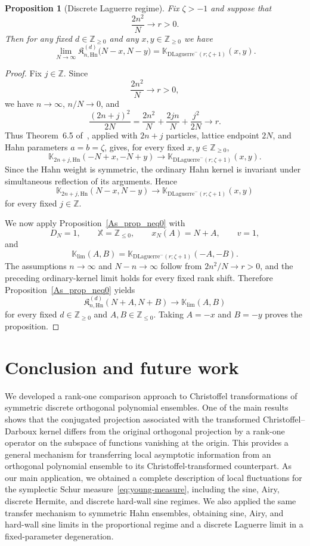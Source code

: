 \documentclass[reqno,11pt]{amsart}
\newcommand{\ZZ}{\mathbb{Z}}
\theoremstyle{plain}
\newtheorem{prop}[thm]{Proposition}
\theoremstyle{definition}
\numberwithin{equation}{section}
\begin{document}
\begin{prop}[Discrete Laguerre regime]\label{prop:hahn_discr-Laguerre}
Fix \(\zeta>-1\) and suppose that
\[
\frac{2n^2}{N}\longrightarrow r>0.
\]
Then for any fixed $d\in\ZZ_{\ge0}$ and
any $x,y\in\ZZ_{\ge0}$ we have
\[
\lim_{N\to\infty}
\mathfrak K^{(d)}_{n,\mathrm{Hn}}
\bigl(N-x,N-y\bigr)
=
\mathbb K_{\mathrm{DLaguerre}^{-}(r;\zeta+1)}(x,y).
\]
\end{prop}
\begin{proof}
Fix $j\in\ZZ$. Since
\[
\frac{2n^2}{N}\longrightarrow r>0,
\]
we have $n\to\infty$, $n/N\to0$, and
\[
\frac{(2n+j)^2}{2N} =
\frac{2n^2}{N} +
\frac{2jn}{N} +
\frac{j^2}{2N}
\longrightarrow r.
\]
Thus Theorem~6.5 of~\cite{Borodin_2017}, applied with $2n+j$
particles, lattice endpoint $2N$, and Hahn parameters
$a=b=\zeta$, gives, for every fixed $x,y\in\ZZ_{\geq0}$,
\[
\mathbb K_{2n+j,\mathrm{Hn}}(-N+x,-N+y)
\longrightarrow
\mathbb K_{\mathrm{DLaguerre}^{-}(r;\zeta+1)}(x,y).
\]
Since the Hahn weight is symmetric, the ordinary Hahn kernel is
invariant under simultaneous reflection of its arguments. Hence
\[
\mathbb K_{2n+j,\mathrm{Hn}}(N-x,N-y)
\longrightarrow
\mathbb K_{\mathrm{DLaguerre}^{-}(r;\zeta+1)}(x,y)
\]
for every fixed $j\in\ZZ$.

We now apply Proposition~\ref{As_prop_neq0} with
\[
D_N=1,\qquad
\mathbb X=\ZZ_{\leq0},\qquad
x_N(A)=N+A,\qquad
v=1,
\]
and
\[
\mathbb K_{\lim}(A,B) =
\mathbb K_{\mathrm{DLaguerre}^{-}(r;\zeta+1)}(-A,-B).
\]
The assumptions $n\to\infty$ and $N-n\to\infty$ follow from
$2n^2/N\to r>0$, and the preceding ordinary-kernel limit holds for
every fixed rank shift. Therefore Proposition~\ref{As_prop_neq0}
yields
\[
\mathfrak K^{(d)}_{n,\mathrm{Hn}}(N+A,N+B)
\longrightarrow
\mathbb K_{\lim}(A,B)
\]
for every fixed $d\in\ZZ_{\geq0}$ and $A,B\in\ZZ_{\leq0}$.
Taking $A=-x$ and $B=-y$ proves the proposition.
\end{proof}
\section*{Conclusion and future work}

We developed a rank-one comparison approach to Christoffel transformations of symmetric discrete orthogonal polynomial ensembles. One of the main results shows that the conjugated projection associated with the transformed Christoffel--Darboux kernel differs from the original orthogonal projection by a rank-one operator on the subspace of functions vanishing at the origin. This provides a general mechanism for transferring local asymptotic information from an orthogonal polynomial ensemble to its Christoffel-transformed counterpart. 
As our main application, we obtained a complete description of local fluctuations for the symplectic Schur measure~\eqref{eq:young-measure}, including the sine, Airy, discrete Hermite, and discrete hard-wall sine regimes. 
We also applied the same transfer mechanism to symmetric Hahn ensembles, obtaining sine, Airy, and hard-wall sine limits in the proportional regime and a discrete Laguerre limit in a fixed-parameter degeneration.
\end{document}

